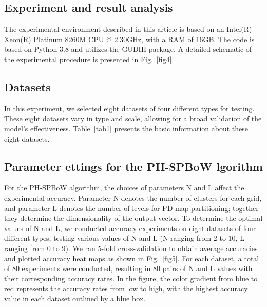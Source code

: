\documentclass[5GeSdc,ASOC,numref,printGA,printHL,CASflow,nocrossmark,longtitle,PROOF]{/usr/local/texlive/iTemplates/01-Templates/01-Els-Jnl/01-Standard_Templates/V1/ELS_MDL5-V1-6}
\begin{document}
\begin{articlestyle}
\section{Experiment and result analysis}\label{sec5}

The experimental environment described in this article is based on an Intel(R) Xeon(R) Platinum 8260M CPU @ 2.30GHz, with a RAM of 16GB. The code is based on Python 3.8 and utilizes the GUDHI package. A detailed schematic of the experimental procedure is presented in \hyperref[fig4]{Fig.~\ref{fig4}}.



\subsection{Datasets}\label{sec5.1}

In this experiment, we selected eight datasets of four different types for testing. These eight datasets vary in type and scale, allowing for a broad validation of the model's effectiveness. \hyperref[tab1]{Table~\ref{tab1}} presents the basic information about these eight datasets.\enlargethispage*{-337pt}


\subsection{Parameter ettings for the PH-SPBoW lgorithm}\label{sec5.2}

{For the PH-SPBoW algorithm, the choices of parameters N and L affect the experimental accuracy. Parameter N denotes the number of clusters for each grid, and parameter L denotes the number of levels for PD map partitioning; together they determine the dimensionality of the output vector. To determine the optimal values of N and L, we conducted accuracy experiments on eight datasets of four different types, testing various values of N and L (N ranging from 2 to 10, L ranging from 0 to 9). We ran 5-fold cross-validation to obtain average accuracies and plotted accuracy heat maps as shown in \hyperref[fig5]{Fig.~\ref{fig5}}. For each dataset, a total of 80 experiments were conducted, resulting in 80 pairs of N and L values with their corresponding accuracy rates. In the figure, the color gradient from blue to red represents the accuracy rates from low to high, with the highest accuracy value in each dataset outlined by a blue box.}




\end{articlestyle}
\end{document}
